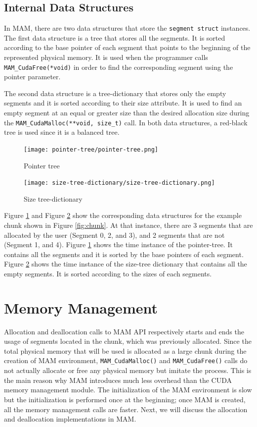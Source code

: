 \documentclass[conference]{IEEEtran}
\def\code#1{\texttt{#1}}
\begin{document}
\subsection{Internal Data Structures}
In MAM, there are two data structures that store the \code{segment struct} instances. The first data structure is a tree that stores all the segments. It is sorted according to the base pointer of each segment that points to the beginning of the represented physical memory. It is used when the programmer calls \code{MAM\_CudaFree(*void)} in order to find the corresponding segment using the pointer parameter.

The second data structure is a tree-dictionary that stores only the empty segments and it is sorted according to their size attribute. It is used to find an empty segment at an equal or greater size than the desired allocation size during the \code{MAM\_CudaMalloc(**void, size\_t)} call. In both data structures, a red-black tree is used since it is a balanced tree. 

\begin{figure}[h!]
\centering
  \texttt{[image: pointer-tree/pointer-tree.png]}
  \caption{Pointer tree}
  \label{fig:ptree}
\end{figure}

\begin{figure}
\centering
 \texttt{[image: size-tree-dictionary/size-tree-dictionary.png]}
  \caption{Size tree-dictionary}
  \label{fig:stree}
\end{figure}

Figure \ref{fig:ptree} and Figure \ref{fig:stree} show the corresponding data structures for the example chunk shown in Figure \ref{fig:chunk}. At that instance, there are 3 segments that are allocated by the user (Segment 0, 2, and 3), and 2 segments that are not (Segment 1, and 4). Figure \ref{fig:ptree} shows the time instance of the pointer-tree. It contains all the segments and it is sorted by the base pointers of each segment. Figure \ref{fig:stree} shows the time instance of the size-tree dictionary that contains all the empty segments. It is sorted according to the sizes of each segments. 


\section{Memory Management}
Allocation and deallocation calls to MAM API respectively starts and ends the usage of segments located in the chunk, which was previously allocated. Since the total physical memory that will be used is allocated as a large chunk during the creation of MAM environment, \code{MAM\_CudaMalloc()} and \code{MAM\_CudaFree()} calls do not actually allocate or free any physical memory but imitate the process. This is the main reason why  MAM introduces much less overhead than the CUDA memory management module. 
The initialization of the MAM environment is slow but the initialization is performed once at the beginning; once MAM is created, all the memory management calls are faster. 
Next, we will discuss the allocation and deallocation implementations in MAM. 
\end{document}
